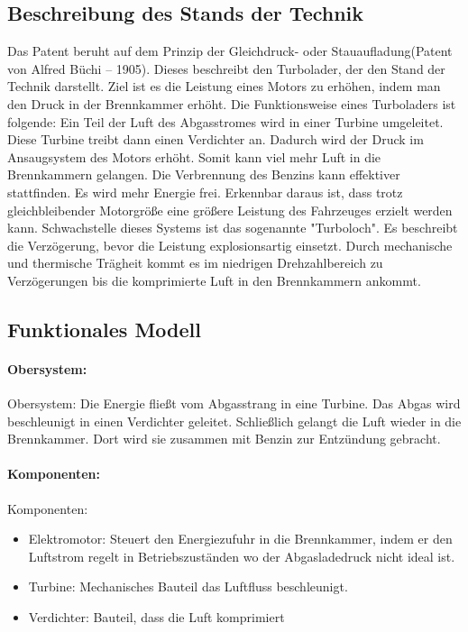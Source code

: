 \documentclass[11pt,a4paper]{article}
\begin{document}
\subsection{Beschreibung des Stands der Technik}
Das Patent beruht auf dem Prinzip der Gleichdruck- oder Stauaufladung(Patent
von Alfred Büchi -- 1905).  Dieses beschreibt den Turbolader, der den Stand der
Technik darstellt.  Ziel ist es die Leistung eines Motors zu erhöhen, indem
man den Druck in der Brennkammer erhöht.  Die Funktionsweise eines Turboladers
ist folgende: Ein Teil der Luft des Abgasstromes wird in einer Turbine
umgeleitet. Diese Turbine treibt dann einen Verdichter an. Dadurch wird der
Druck im Ansaugsystem des Motors erhöht. Somit kann viel mehr Luft in die
Brennkammern gelangen.  Die Verbrennung des Benzins kann effektiver
stattfinden. Es wird mehr Energie frei.  Erkennbar daraus ist, dass trotz
gleichbleibender Motorgröße eine größere Leistung des Fahrzeuges erzielt
werden kann.  Schwachstelle dieses Systems ist das sogenannte "Turboloch". Es
beschreibt die Verzögerung, bevor die Leistung explosionsartig einsetzt. Durch
mechanische und thermische Trägheit kommt es im niedrigen Drehzahlbereich zu
Verzögerungen bis die komprimierte Luft in den Brennkammern ankommt.
\subsection{Funktionales Modell}
\paragraph{Obersystem:}
Obersystem: Die Energie fließt vom Abgasstrang in eine Turbine. Das Abgas wird
beschleunigt in einen Verdichter geleitet. Schließlich gelangt die Luft wieder
in die Brennkammer. Dort wird sie zusammen mit Benzin zur Entzündung gebracht.

\paragraph{Komponenten:}
Komponenten:
\begin{itemize}
\item Elektromotor: Steuert den Energiezufuhr in die Brennkammer, indem er den
  Luftstrom regelt in Betriebszuständen wo der Abgasladedruck nicht ideal ist.
\item Turbine: Mechanisches Bauteil das Luftfluss beschleunigt.
\item Verdichter: Bauteil, dass die Luft komprimiert 
\end{itemize}
  
\end{document}
